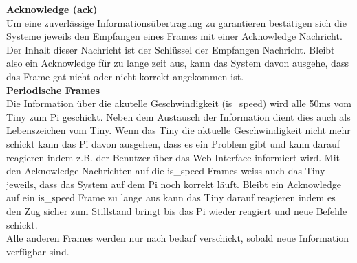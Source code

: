 \documentclass[../../main.tex]{subfiles}
\begin{document}
        \pagebreak

        \textbf{Acknowledge (ack)}\\
        Um eine zuverlässige Informationsübertragung zu garantieren bestätigen sich die Systeme jeweils den Empfangen eines Frames mit einer Acknowledge Nachricht. Der Inhalt dieser Nachricht ist der Schlüssel der Empfangen Nachricht. Bleibt also ein Acknowledge für zu lange zeit aus, kann das System davon ausgehe, dass das Frame gat nicht oder nicht korrekt angekommen ist.\\

        \textbf{Periodische Frames}\\
        Die Information über die akutelle Geschwindigkeit (is\_speed) wird alle 50ms vom Tiny zum Pi geschickt. Neben dem Austausch der Information dient dies auch als Lebenszeichen vom Tiny. Wenn das Tiny die aktuelle Geschwindigkeit nicht mehr schickt kann das Pi davon ausgehen, dass es ein Problem gibt und kann darauf reagieren indem z.B. der Benutzer über das Web-Interface informiert wird. Mit den Acknowledge Nachrichten auf die is\_speed Frames weiss auch das Tiny jeweils, dass das System auf dem Pi noch korrekt läuft. Bleibt ein Acknowledge auf ein is\_speed Frame zu lange aus kann das Tiny darauf reagieren indem es den Zug sicher zum Stillstand bringt bis das Pi wieder reagiert und neue Befehle schickt.\\
        Alle anderen Frames werden nur nach bedarf verschickt, sobald neue Information verfügbar sind.

    
\end{document}

